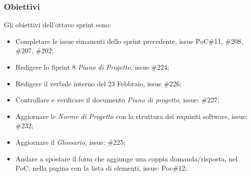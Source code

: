 \subsubsection{Obiettivi}
\label{sec:sprint8_obiettivi}
Gli obiettivi dell'ottavo sprint sono:
\begin{itemize}
    \item Completare le issue rimanenti dello sprint precedente, issue PoC\#11, \#208, \#207, \#202;
    \item Redigere lo Sprint 8 \textit{Piano di Progetto}, issue \#224;
    \item Redigere il verbale interno del 23 Febbraio, issue \#226;
    \item Controllare e verificare il documento \textit{Piano di progetto}, issue: \#227;
    \item Aggiornare le \textit{Norme di Progetto} con la struttura dei requisiti software, issue: \#232;
    \item Aggiornare il \textit{Glossario}, issue: \#225;
    \item Andare a spostare il form che aggiunge una coppia domanda/risposta, nel PoC, nella pagina con la lista di elementi, issue: Poc\#12;
\end{itemize}